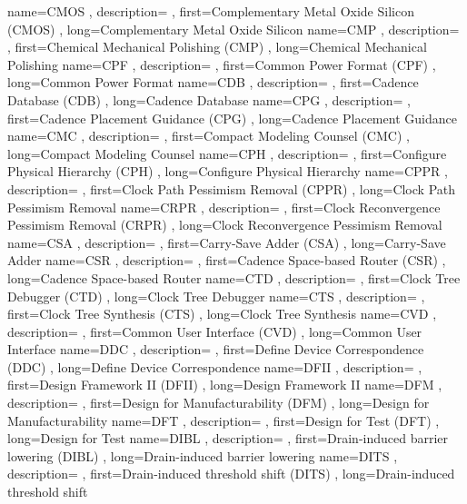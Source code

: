{ name={CMOS}
, description={}
, first={Complementary Metal Oxide Silicon (CMOS)}
, long={Complementary Metal Oxide Silicon}
}
{ name={CMP}
, description={}
, first={Chemical Mechanical Polishing (CMP)}
, long={Chemical Mechanical Polishing}
}
{ name={CPF}
, description={}
, first={Common Power Format (CPF)}
, long={Common Power Format}
}
{ name={CDB}
, description={}
, first={Cadence Database (CDB)}
, long={Cadence Database}
}
{ name={CPG}
, description={}
, first={Cadence Placement Guidance (CPG)}
, long={Cadence Placement Guidance}
}
{ name={CMC}
, description={}
, first={Compact Modeling Counsel (CMC)}
, long={Compact Modeling Counsel}
}
{ name={CPH}
, description={}
, first={Configure Physical Hierarchy (CPH)}
, long={Configure Physical Hierarchy}
}
{ name={CPPR}
, description={}
, first={Clock Path Pessimism Removal (CPPR)}
, long={Clock Path Pessimism Removal}
}
{ name={CRPR}
, description={}
, first={Clock Reconvergence Pessimism Removal (CRPR)}
, long={Clock Reconvergence Pessimism Removal}
}
{ name={CSA}
, description={}
, first={Carry-Save Adder (CSA)}
, long={Carry-Save Adder}
}
{ name={CSR}
, description={}
, first={Cadence Space-based Router (CSR)}
, long={Cadence Space-based Router}
}
{ name={CTD}
, description={}
, first={Clock Tree Debugger (CTD)}
, long={Clock Tree Debugger}
}
{ name={CTS}
, description={}
, first={Clock Tree Synthesis (CTS)}
, long={Clock Tree Synthesis}
}
{ name={CVD}
, description={}
, first={Common User Interface (CVD)}
, long={Common User Interface}
}
{ name={DDC}
, description={}
, first={Define Device Correspondence (DDC)}
, long={Define Device Correspondence}
}
{ name={DFII}
, description={}
, first={Design Framework II (DFII)}
, long={Design Framework II}
}
{ name={DFM}
, description={}
, first={Design for Manufacturability (DFM)}
, long={Design for Manufacturability}
}
{ name={DFT}
, description={}
, first={Design for Test (DFT)}
, long={Design for Test}
}
{ name={DIBL}
, description={}
, first={Drain-induced barrier lowering (DIBL)}
, long={Drain-induced barrier lowering}
}
{ name={DITS}
, description={}
, first={Drain-induced threshold shift (DITS)}
, long={Drain-induced threshold shift}
}
